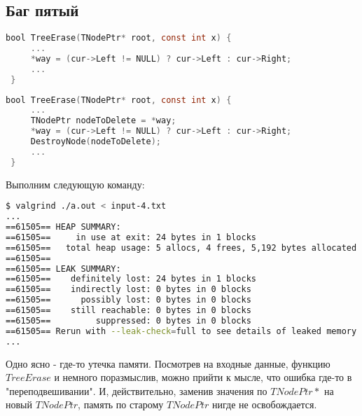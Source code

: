 \documentclass[12pt]{article}
\begin{document}
\subsection{Баг пятый}
\begin{lstlisting}[language=C, backgroundcolor=\color{myred}]
 bool TreeErase(TNodePtr* root, const int x) {
     ...
     *way = (cur->Left != NULL) ? cur->Left : cur->Right;
     ...
 }
\end{lstlisting}
\begin{lstlisting}[language=C, caption=tree.c, captionpos=b, backgroundcolor=\color{mygreen}]
 bool TreeErase(TNodePtr* root, const int x) {
     ...
     TNodePtr nodeToDelete = *way;
     *way = (cur->Left != NULL) ? cur->Left : cur->Right;
     DestroyNode(nodeToDelete);
     ...
 }
\end{lstlisting}
Выполним следующую команду:
\begin{lstlisting}[language=bash, frame=L]
$ valgrind ./a.out < input-4.txt
...
==61505== HEAP SUMMARY:
==61505==     in use at exit: 24 bytes in 1 blocks
==61505==   total heap usage: 5 allocs, 4 frees, 5,192 bytes allocated
==61505== 
==61505== LEAK SUMMARY:
==61505==    definitely lost: 24 bytes in 1 blocks
==61505==    indirectly lost: 0 bytes in 0 blocks
==61505==      possibly lost: 0 bytes in 0 blocks
==61505==    still reachable: 0 bytes in 0 blocks
==61505==         suppressed: 0 bytes in 0 blocks
==61505== Rerun with --leak-check=full to see details of leaked memory
...
\end{lstlisting}
Одно ясно - где-то утечка памяти. Посмотрев на входные данные, функцию $TreeErase$ и немного поразмыслив, можно прийти к мысле, что ошибка где-то в "переподвешивании". И, действительно, заменив значения по $TNodePtr*$ на новый $TNodePtr$, память по старому $TNodePtr$ нигде не освобождается.
\end{document}
